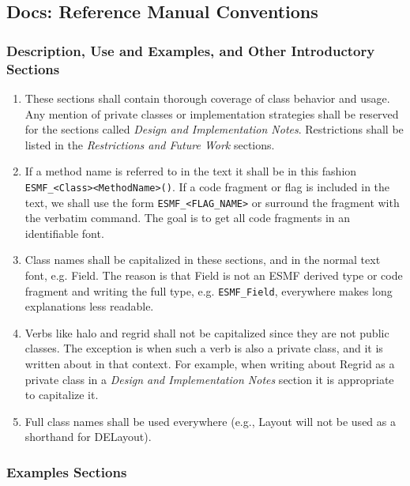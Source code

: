 \subsection{Docs: Reference Manual Conventions}

\subsubsection{Description, Use and Examples, and Other Introductory Sections}

\begin{enumerate}
\item These sections shall contain thorough coverage of class
behavior and usage.  Any mention of private classes or implementation 
strategies shall be reserved for the sections called {\it Design and 
Implementation Notes}.  Restrictions shall be listed in the 
{\it Restrictions and Future Work} sections.
  
\item If a method name is referred to in the text it shall be in this
fashion {\tt ESMF\_<Class><MethodName>()}.  If a code fragment or flag is
included in the text, we shall use the form {\tt ESMF\_<FLAG\_NAME>} 
or surround the fragment with the \latex  verbatim command.  The 
goal is to get all code fragments in an identifiable font.

\item Class names shall be capitalized in these sections, and
in the normal text font, e.g. Field.  The reason is that 
Field is not an ESMF derived type or code fragment and writing 
the full type, e.g. {\tt ESMF\_Field}, everywhere makes long 
explanations less readable.

\item Verbs like halo and regrid shall not be capitalized since they 
are not public classes. The exception is when such a verb is also a
private class, and it is written about in that context.  For example, 
when writing about Regrid as a private class in a {\it Design and 
Implementation Notes} section it is appropriate to capitalize it.

\item Full class names shall be used everywhere (e.g., Layout will
not be used as a shorthand for DELayout).

\end{enumerate}

\subsubsection{Examples Sections}

